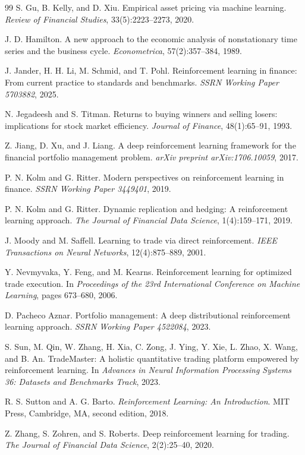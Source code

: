 \documentclass[10pt,twocolumn]{article}
\begin{document}
\begin{thebibliography}{99}
S. Gu, B. Kelly, and D. Xiu.
\newblock Empirical asset pricing via machine learning.
\newblock \emph{Review of Financial Studies}, 33(5):2223--2273, 2020.

J. D. Hamilton.
\newblock A new approach to the economic analysis of nonstationary time series
  and the business cycle.
\newblock \emph{Econometrica}, 57(2):357--384, 1989.

J. Jander, H. H. Li, M. Schmid, and T. Pohl.
\newblock Reinforcement learning in finance: From current practice to standards
  and benchmarks.
\newblock \emph{SSRN Working Paper 5703882}, 2025.

N. Jegadeesh and S. Titman.
\newblock Returns to buying winners and selling losers: implications for stock
  market efficiency.
\newblock \emph{Journal of Finance}, 48(1):65--91, 1993.

Z. Jiang, D. Xu, and J. Liang.
\newblock A deep reinforcement learning framework for the financial portfolio
  management problem.
\newblock \emph{arXiv preprint arXiv:1706.10059}, 2017.

P. N. Kolm and G. Ritter.
\newblock Modern perspectives on reinforcement learning in finance.
\newblock \emph{SSRN Working Paper 3449401}, 2019.

P. N. Kolm and G. Ritter.
\newblock Dynamic replication and hedging: A reinforcement learning approach.
\newblock \emph{The Journal of Financial Data Science}, 1(4):159--171, 2019.

J. Moody and M. Saffell.
\newblock Learning to trade via direct reinforcement.
\newblock \emph{IEEE Transactions on Neural Networks}, 12(4):875--889, 2001.

Y. Nevmyvaka, Y. Feng, and M. Kearns.
\newblock Reinforcement learning for optimized trade execution.
\newblock In \emph{Proceedings of the 23rd International Conference on Machine
  Learning}, pages 673--680, 2006.

D. Pacheco Aznar.
\newblock Portfolio management: A deep distributional reinforcement learning
  approach.
\newblock \emph{SSRN Working Paper 4522084}, 2023.

S. Sun, M. Qin, W. Zhang, H. Xia, C. Zong, J. Ying, Y. Xie, L. Zhao,
  X. Wang, and B. An.
\newblock TradeMaster: A holistic quantitative trading platform empowered by
  reinforcement learning.
\newblock In \emph{Advances in Neural Information Processing Systems 36:
  Datasets and Benchmarks Track}, 2023.

R. S. Sutton and A. G. Barto.
\newblock \emph{Reinforcement Learning: An Introduction}.
\newblock MIT Press, Cambridge, MA, second edition, 2018.

Z. Zhang, S. Zohren, and S. Roberts.
\newblock Deep reinforcement learning for trading.
\newblock \emph{The Journal of Financial Data Science}, 2(2):25--40, 2020.

\end{thebibliography}
\end{document}
